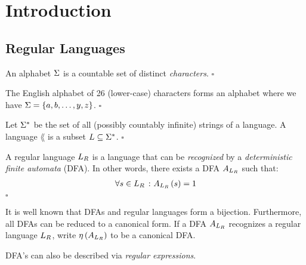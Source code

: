 \section{Introduction}

\subsection{Regular Languages}

\begin{definition}[Alphabet]
  An alphabet \(\Sigma\) is a countable set of distinct
  \textit{characters}.
  \hfill\(\square\)
\end{definition}

\begin{example}
  The English alphabet of 26 (lower-case) characters forms an alphabet
  where we have
  \(\Sigma = \left\{a, b, \ldots, y, z\right\}\).
  \hfill\(\square\)
\end{example}

\begin{definition}[Language]
  Let \(\Sigma^\ast\) be the set of all (possibly countably infinite)
  strings of a language.
  A language \(\lang\) is a subset \(L \subseteq \Sigma^\ast\).
  \hfill\(\square\)
\end{definition}

\begin{definition}
  A regular language \(L_{R}\) is a language that can be
  \textit{recognized} by a \textit{deterministic finite automata} (DFA).
  In other words, there exists a DFA \(A_{L_{R}}\) such that:
  \begin{align*}
    \forall s \in L_{R} \ \colon A_{L_{R}}\left(s\right) = 1
  \end{align*}
  \hfill\(\square\)
\end{definition}

It is well known that DFAs and regular languages form a bijection.
Furthermore, all DFAs can be reduced to a canonical form.
If a DFA \(A_{L_{R}}\) recognizes a regular language \(L_{R}\),
write \(\eta\left(A_{L_{R}}\right)\) to be a canonical DFA.

DFA's can also be described via \textit{regular expressions}.

